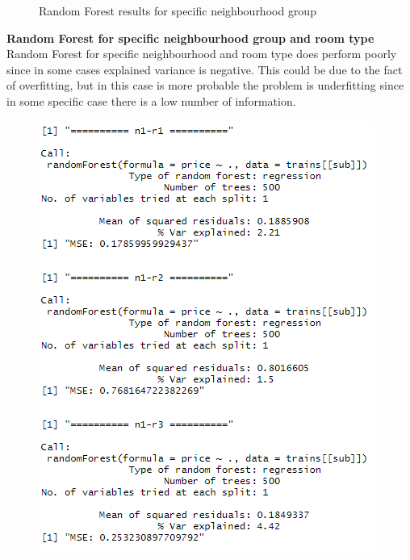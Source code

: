 \documentclass{FR16}
\begin{document}
\begin{figure}[!htb]
\begin{minipage}{0.48\textwidth}
   \end{minipage}
        \caption{ Random Forest results for specific neighbourhood group}\label{fig:14}

\end{figure}

\newpage
\noindent \textbf{Random Forest  for specific neighbourhood group and room type}\\
Random Forest for specific neighbourhood and room type does perform poorly since in some cases explained variance is negative. This could be due to the fact of overfitting, but in this case is more probable the problem is underfitting since in some specific case there is a low number of information.
\begin{figure}[!htb]
   \begin{minipage}{0.33\textwidth}
     \centering
     \includegraphics[width=1\linewidth]{figures/rf2.png} 
   \end{minipage}\hfill
   \begin{minipage}{0.33\textwidth}

\end{minipage}
\end{figure}
\end{document}
